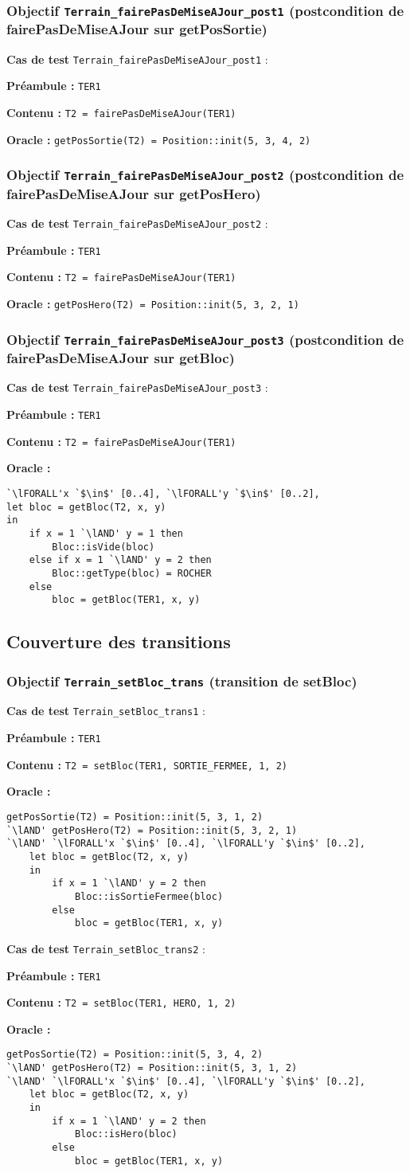 \documentclass{article}
\newcommand{\cmd}[1]{\texttt{#1}}
\newcommand{\lAND}{$\land$}
\newcommand{\lFORALL}{$\forall$}
\newcommand{\obj}[2]{\subsubsection*{\large{\textbf{Objectif {\cmd{#1} (#2)}}}}}
\newenvironment{cas}[1]
{
	\hspace{1em}\textbf{Cas de test} \cmd{#1} :
	\begin{list}{}{}
}{
	\end{list}\vspace{1em}
}
\newcommand{\pre}[1]{\item \textbf{Préambule :} \cmd{#1}}
\newcommand{\ope}[1]{\item \textbf{Contenu :} \cmd{#1}}
\newcommand{\ora}[1]{\item \textbf{Oracle :} \cmd{#1}}
\newcommand{\oram}{\item \textbf{Oracle :}}
\begin{document}
\obj{Terrain\_fairePasDeMiseAJour\_post1} {postcondition de fairePasDeMiseAJour sur getPosSortie}
	\begin{cas} {Terrain\_fairePasDeMiseAJour\_post1}
		\pre{TER1}
		\ope{T2 = fairePasDeMiseAJour(TER1)}
		\ora{getPosSortie(T2) = Position::init(5, 3, 4, 2)}
	\end{cas}

\obj{Terrain\_fairePasDeMiseAJour\_post2} {postcondition de fairePasDeMiseAJour sur getPosHero}
	\begin{cas} {Terrain\_fairePasDeMiseAJour\_post2}
		\pre{TER1}
		\ope{T2 = fairePasDeMiseAJour(TER1)}
		\ora{getPosHero(T2) = Position::init(5, 3, 2, 1)}
	\end{cas}

\obj{Terrain\_fairePasDeMiseAJour\_post3} {postcondition de fairePasDeMiseAJour sur getBloc}
	\begin{cas} {Terrain\_fairePasDeMiseAJour\_post3}
		\pre{TER1}
		\ope{T2 = fairePasDeMiseAJour(TER1)}
		\oram{}
		\begin{lstlisting}
`\lFORALL'x `$\in$' [0..4], `\lFORALL'y `$\in$' [0..2],
let bloc = getBloc(T2, x, y)
in
	if x = 1 `\lAND' y = 1 then
		Bloc::isVide(bloc)
	else if x = 1 `\lAND' y = 2 then
		Bloc::getType(bloc) = ROCHER
	else
		bloc = getBloc(TER1, x, y)
		\end{lstlisting}
	\end{cas}


\subsection*{Couverture des transitions}

\obj{Terrain\_setBloc\_trans} {transition de setBloc}
	\begin{cas} {Terrain\_setBloc\_trans1}
		\pre{TER1}
		\ope{T2 = setBloc(TER1, SORTIE\_FERMEE, 1, 2)}
		\oram{}
		\begin{lstlisting}
getPosSortie(T2) = Position::init(5, 3, 1, 2)
`\lAND' getPosHero(T2) = Position::init(5, 3, 2, 1)
`\lAND' `\lFORALL'x `$\in$' [0..4], `\lFORALL'y `$\in$' [0..2],
	let bloc = getBloc(T2, x, y)
	in
		if x = 1 `\lAND' y = 2 then
			Bloc::isSortieFermee(bloc)
		else
			bloc = getBloc(TER1, x, y)
		\end{lstlisting}
	\end{cas}

	\begin{cas} {Terrain\_setBloc\_trans2}
		\pre{TER1}
		\ope{T2 = setBloc(TER1, HERO, 1, 2)}
		\oram{}
		\begin{lstlisting}
getPosSortie(T2) = Position::init(5, 3, 4, 2)
`\lAND' getPosHero(T2) = Position::init(5, 3, 1, 2)
`\lAND' `\lFORALL'x `$\in$' [0..4], `\lFORALL'y `$\in$' [0..2],
	let bloc = getBloc(T2, x, y)
	in
		if x = 1 `\lAND' y = 2 then
			Bloc::isHero(bloc)
		else
			bloc = getBloc(TER1, x, y)
		\end{lstlisting}
	\end{cas}
\end{document}
